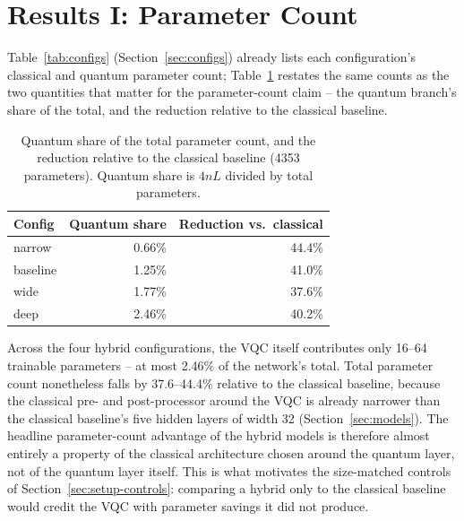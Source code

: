 \section{Results I: Parameter Count}
\label{sec:results-params}

Table~\ref{tab:configs} (Section~\ref{sec:configs}) already lists each configuration's classical and
quantum parameter count; Table~\ref{tab:paramshare} restates the same counts as the two quantities that
matter for the parameter-count claim -- the quantum branch's share of the total, and the reduction relative
to the classical baseline.

\begin{table}[h]
\centering
\caption{Quantum share of the total parameter count, and the reduction relative to the classical baseline
(4353 parameters). Quantum share is $4nL$ divided by total parameters.}
\label{tab:paramshare}
\begin{tabular}{@{}lrr@{}}
\toprule
Config & Quantum share & Reduction vs.\ classical \\
\midrule
narrow   & 0.66\% & 44.4\% \\
baseline & 1.25\% & 41.0\% \\
wide     & 1.77\% & 37.6\% \\
deep     & 2.46\% & 40.2\% \\
\bottomrule
\end{tabular}
\end{table}

Across the four hybrid configurations, the VQC itself contributes only 16--64 trainable parameters -- at
most 2.46\% of the network's total. Total parameter count nonetheless falls by 37.6--44.4\% relative to the
classical baseline, because the classical pre- and post-processor around the VQC is already narrower than
the classical baseline's five hidden layers of width 32 (Section~\ref{sec:models}). The headline
parameter-count advantage of the hybrid models is therefore almost entirely a property of the classical
architecture chosen around the quantum layer, not of the quantum layer itself. This is what motivates the
size-matched controls of Section~\ref{sec:setup-controls}: comparing a hybrid only to the classical baseline
would credit the VQC with parameter savings it did not produce.
